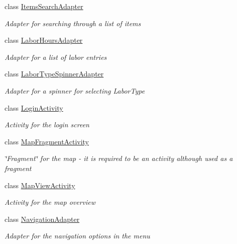 \begin{DoxyCompactItemize}
class \hyperlink{class_field_service_1_1_android_1_1_items_search_adapter}{Items\+Search\+Adapter}
\begin{DoxyCompactList}\small\item\em Adapter for searching through a list of items \end{DoxyCompactList}\item 
class \hyperlink{class_field_service_1_1_android_1_1_labor_hours_adapter}{Labor\+Hours\+Adapter}
\begin{DoxyCompactList}\small\item\em Adapter for a list of labor entries \end{DoxyCompactList}\item 
class \hyperlink{class_field_service_1_1_android_1_1_labor_type_spinner_adapter}{Labor\+Type\+Spinner\+Adapter}
\begin{DoxyCompactList}\small\item\em Adapter for a spinner for selecting Labor\+Type \end{DoxyCompactList}\item 
class \hyperlink{class_field_service_1_1_android_1_1_login_activity}{Login\+Activity}
\begin{DoxyCompactList}\small\item\em Activity for the login screen \end{DoxyCompactList}\item 
class \hyperlink{class_field_service_1_1_android_1_1_map_fragment_activity}{Map\+Fragment\+Activity}
\begin{DoxyCompactList}\small\item\em \char`\"{}\+Fragment\char`\"{} for the map -\/ it is required to be an activity although used as a fragment \end{DoxyCompactList}\item 
class \hyperlink{class_field_service_1_1_android_1_1_map_view_activity}{Map\+View\+Activity}
\begin{DoxyCompactList}\small\item\em Activity for the map overview \end{DoxyCompactList}\item 
class \hyperlink{class_field_service_1_1_android_1_1_navigation_adapter}{Navigation\+Adapter}
\begin{DoxyCompactList}\small\item\em Adapter for the navigation options in the menu \end{DoxyCompactList}\item 

\end{DoxyCompactItemize}
